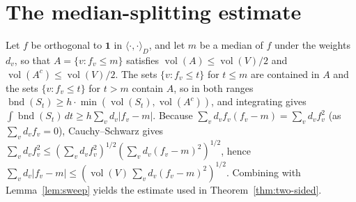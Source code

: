 \documentclass[11pt,a4paper]{article}
\theoremstyle{plain}
\theoremstyle{definition}
\DeclareMathOperator{\vol}{vol}
\DeclareMathOperator{\bnd}{bnd}
\begin{document}
\appendix
\section{The median-splitting estimate}\label{app:proof}

Let $f$ be orthogonal to $\mathbf 1$ in $\langle\cdot,\cdot\rangle_D$, and let
$m$ be a median of $f$ under the weights $d_v$, so that
$A=\{v:f_v\le m\}$ satisfies $\vol(A)\le \vol(V)/2$ and
$\vol(A^c)\le\vol(V)/2$.  The sets $\{v:f_v\le t\}$ for $t\le m$ are contained
in $A$ and the sets $\{v:f_v\le t\}$ for $t>m$ contain $A$, so in both ranges
$\bnd(S_t)\ge h\cdot\min(\vol(S_t),\vol(A^c))$, and integrating gives
$\int \bnd(S_t)\,dt\ge h\sum_v d_v|f_v-m|$.  Because
$\sum_v d_v f_v(f_v-m)=\sum_v d_vf_v^2$ (as $\sum_v d_vf_v=0$), Cauchy--Schwarz
gives $\sum_v d_vf_v^2\le (\sum_v d_vf_v^2)^{1/2}(\sum_v d_v(f_v-m)^2)^{1/2}$,
hence $\sum_v d_v|f_v-m|\le (\vol(V)\,\sum_v d_v(f_v-m)^2)^{1/2}$.  Combining
with Lemma~\ref{lem:sweep} yields the estimate used in Theorem~\ref{thm:two-sided}.



\end{document}
